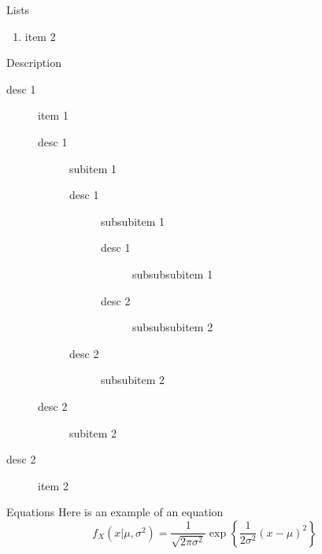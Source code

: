 \documentclass{article}
\begin{document}
\begin{poster}
\begin{posterbox}[name=lists,column=0,below=usage]{Lists}
\begin{enumerate}
\begin{enumerate}
      \item subitem 2
    \end{enumerate}
  \item item 2
\end{enumerate}
Description
\begin{description}
  \item[desc 1] item 1
    \begin{description}
      \item[desc 1] subitem 1
        \begin{description}
          \item[desc 1] subsubitem 1
            \begin{description}
              \item[desc 1] subsubsubitem 1
              \item[desc 2] subsubsubitem 2
            \end{description}
          \item[desc 2] subsubitem 2
        \end{description}
      \item[desc 2] subitem 2
    \end{description}
  \item[desc 2] item 2
\end{description}
\end{posterbox}

\begin{posterbox}[name=equation,column=0,below=lists,above=bottom]{Equations}
Here is an example of an equation
\begin{equation}
  f_X(x|\mu,\sigma^2) = \frac{1}{\sqrt{2\pi\sigma^2}}\exp\left\{\frac{1}{2\sigma^2}(x-\mu)^2\right\}
\end{equation}
\end{posterbox}


\end{poster}
\end{document}

